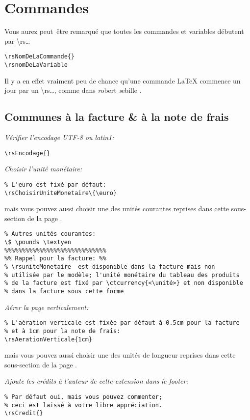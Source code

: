 \documentclass[a4paper,10pt]{article}
\begin{document}
\section{Commandes}

Vous aurez peut~être remarqué que toutes les commandes et variables débutent par \textbackslash rs\dots

\begin{lstlisting}
\rsNomDeLaCommande{}
\rsnomDeLaVariable
\end{lstlisting}

Il y a en effet vraiment peu de chance qu'une commande \LaTeX{} commence un jour par 
un \textbackslash rs\dots, comme dans \og \emph{r}obert \emph{s}ebille \fg.

 
\subsection{Communes à la facture \& à la note de frais}

\emph{Vérifier l'encodage UTF-8 ou latin1:}
\begin{lstlisting}
\rsEncodage{}
\end{lstlisting}

\emph{Choisir l'unité monétaire:}
\begin{lstlisting}
% L'euro est fixé par défaut:
\rsChoisirUniteMonetaire\{\euro}
\end{lstlisting}
mais vous pouvez aussi choisir une des unités courantes reprises dans cette sous-section de la page \pageref{sub:unites_monetaire_courantes}.
\begin{lstlisting}
% Autres unités courantes:
\$ \pounds \textyen
%%%%%%%%%%%%%%%%%%%%%%%%%%%%%
%% Rappel pour la facture: %%
% \rsuniteMonetaire  est disponible dans la facture mais non 
% utilisée par le modèle; l'unité monétaire du tableau des produits 
% de la facture est fixé par \ctcurrency{<\unité>} et non disponible 
% dans la facture sous cette forme
\end{lstlisting}

\emph{Aérer la page verticalement:}
\begin{lstlisting}
% L'aération verticale est fixée par défaut à 0.5cm pour la facture 
% et à 1cm pour la note de frais:
\rsAerationVerticale{1cm}
\end{lstlisting}
mais vous pouvez aussi choisir une des unités de longueur reprises dans cette sous-section de la page \pageref{sub:unites_longueurs}.

\emph{Ajoute les crédits à l'auteur de cette extension dans le footer:}
\begin{lstlisting}
% Par défaut oui, mais vous pouvez commenter;
% ceci est laissé à votre libre appréciation.
\rsCredit{}
\end{lstlisting}
\end{document}
